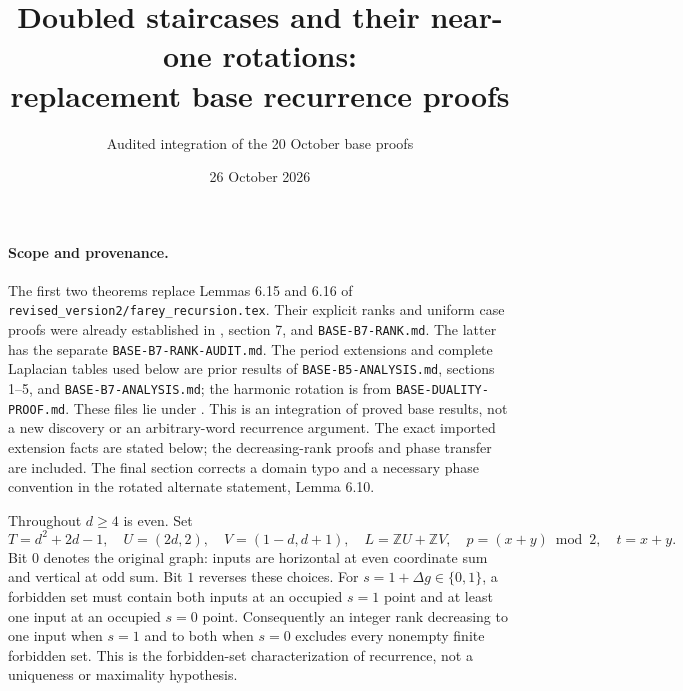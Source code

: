 \documentclass[11pt]{article}
\title{Doubled staircases and their near-one rotations:\\replacement base recurrence proofs}
\author{Audited integration of the 20 October base proofs}
\date{26 October 2026}
\newcommand{\Z}{\mathbb Z}
\begin{document}
\maketitle

\begin{sloppypar}
\paragraph{Scope and provenance.}
The first two theorems replace Lemmas 6.15 and 6.16 of
\texttt{revised\_version2/farey\_recursion.tex}. Their explicit ranks and
uniform case proofs were already established in
, section 7, and
\texttt{BASE-B7-RANK.md}. The latter has the separate
\texttt{BASE-B7-RANK-AUDIT.md}. The period extensions and complete
Laplacian tables used below are prior results of
\texttt{BASE-B5-ANALYSIS.md}, sections 1--5, and
\texttt{BASE-B7-ANALYSIS.md}; the harmonic rotation is from
\texttt{BASE-DUALITY-PROOF.md}. These files lie under
.
This is an integration of proved base results, not a new discovery or an
arbitrary-word recurrence argument. The exact imported extension facts
are stated below; the decreasing-rank proofs and phase transfer are
included. The final section corrects a domain typo and a necessary phase
convention in the rotated alternate statement, Lemma 6.10.
\end{sloppypar}

Throughout $d\ge4$ is even. Set
\[
 T=d^2+2d-1,\quad U=(2d,2),\quad V=(1-d,d+1),\quad L=\Z U+\Z V,
 \quad p=(x+y)\bmod2,\quad t=x+y.
\]
Bit $0$ denotes the original graph: inputs are horizontal at even
coordinate sum and vertical at odd sum. Bit $1$ reverses these choices.
For $s=1+\Delta g\in\{0,1\}$, a forbidden set must contain both inputs
at an occupied $s=1$ point and at least one input at an occupied $s=0$
point. Consequently an integer rank decreasing to one input when $s=1$
and to both when $s=0$ excludes every nonempty finite forbidden set.
This is the forbidden-set characterization of recurrence, not a
uniqueness or maximality hypothesis.
\end{document}
